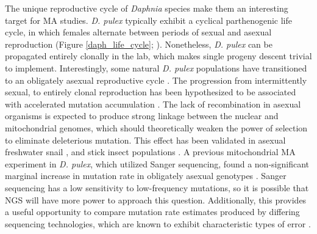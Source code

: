 \documentclass[12pt,twoside]{reedthesis}
\begin{document}
The unique reproductive cycle of \textit{Daphnia} species make them an interesting target for \gls{MA} studies.
\textit{D. pulex} typically exhibit a cyclical parthenogenic life cycle, in which females alternate between periods of sexual and asexual reproduction (Figure \ref{daph_life_cycle}; \citealp{ebert_ecology_2005}).
Nonetheless, \textit{D. pulex} can be propagated entirely clonally in the lab, which makes single progeny descent trivial to implement.
Interestingly, some natural \textit{D. pulex} populations have transitioned to an obligately asexual reproductive cycle \citep{innes_origin_1988}.
The progression from intermittently sexual, to entirely clonal reproduction has been hypothesized to be associated with accelerated mutation accumulation \citep{normark_testing_2000}.
The lack of recombination in asexual organisms is expected to produce strong linkage between the nuclear and mitochondrial genomes, which should theoretically weaken the power of selection to eliminate deleterious mutation.
This effect has been validated in asexual freshwater snail \citep{neiman_accelerated_2010}, and stick insect populations \citep{henry_deleterious_2012}.
A previous mitochondrial \gls{MA} experiment in \textit{D. pulex}, which utilized Sanger sequencing, found a non-significant marginal increase in mutation rate in obligately asexual genotypes \citep{xu_high_2012}.
Sanger sequencing has a low sensitivity to low-frequency mutations, so it is possible that \gls{NGS} will have more power to approach this question. 
Additionally, this provides a useful opportunity to compare mutation rate estimates produced by differing sequencing technologies, which are known to exhibit characteristic types of error \citep{nakamura_sequence-specific_2011}. 
\end{document}
